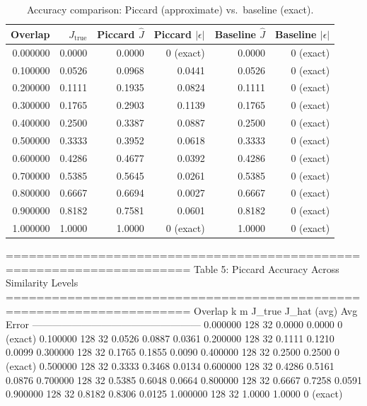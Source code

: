 \begin{table}[t]
\centering
\caption{Accuracy comparison: Piccard (approximate) vs.\ baseline (exact).}
\label{tab:accuracy}
\begin{tabular}{rrrrrr}
\toprule
Overlap & $J_{\text{true}}$ & Piccard $\hat{J}$ & Piccard $|\epsilon|$ & Baseline $\hat{J}$ & Baseline $|\epsilon|$ \\
\midrule
0.000000 & 0.0000 & 0.0000 & 0 (exact) & 0.0000 & 0 (exact) \\
0.100000 & 0.0526 & 0.0968 & 0.0441 & 0.0526 & 0 (exact) \\
0.200000 & 0.1111 & 0.1935 & 0.0824 & 0.1111 & 0 (exact) \\
0.300000 & 0.1765 & 0.2903 & 0.1139 & 0.1765 & 0 (exact) \\
0.400000 & 0.2500 & 0.3387 & 0.0887 & 0.2500 & 0 (exact) \\
0.500000 & 0.3333 & 0.3952 & 0.0618 & 0.3333 & 0 (exact) \\
0.600000 & 0.4286 & 0.4677 & 0.0392 & 0.4286 & 0 (exact) \\
0.700000 & 0.5385 & 0.5645 & 0.0261 & 0.5385 & 0 (exact) \\
0.800000 & 0.6667 & 0.6694 & 0.0027 & 0.6667 & 0 (exact) \\
0.900000 & 0.8182 & 0.7581 & 0.0601 & 0.8182 & 0 (exact) \\
1.000000 & 1.0000 & 1.0000 & 0 (exact) & 1.0000 & 0 (exact) \\
\bottomrule
\end{tabular}
\end{table}


======================================================================
  Table 5: Piccard Accuracy Across Similarity Levels
======================================================================
   Overlap    k   m  J_true  J_hat (avg)  Avg Error
---------------------------------------------------
  0.000000  128  32  0.0000       0.0000  0 (exact)
  0.100000  128  32  0.0526       0.0887     0.0361
  0.200000  128  32  0.1111       0.1210     0.0099
  0.300000  128  32  0.1765       0.1855     0.0090
  0.400000  128  32  0.2500       0.2500  0 (exact)
  0.500000  128  32  0.3333       0.3468     0.0134
  0.600000  128  32  0.4286       0.5161     0.0876
  0.700000  128  32  0.5385       0.6048     0.0664
  0.800000  128  32  0.6667       0.7258     0.0591
  0.900000  128  32  0.8182       0.8306     0.0125
  1.000000  128  32  1.0000       1.0000  0 (exact)

